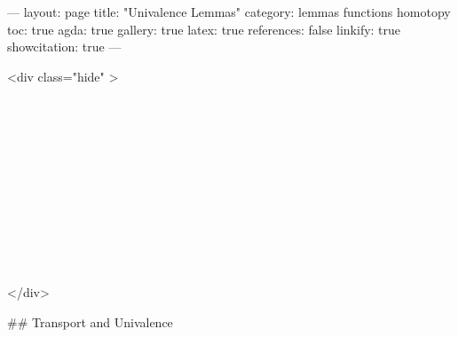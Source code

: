 ---
layout: page
title: "Univalence Lemmas"
category: lemmas functions homotopy
toc: true
agda: true
gallery: true
latex: true
references: false
linkify: true
showcitation: true
---

<div class="hide" >
\begin{code}%
\>[0]\AgdaSymbol{\{-\#}\AgdaSpace{}%
\AgdaSpace{}%
\AgdaSpace{}%
\AgdaSymbol{\#-\}}\<%
\\
\>[0]\AgdaSpace{}%
\AgdaSpace{}%
\<%
\\
\>[0]\AgdaSpace{}%
\AgdaSpace{}%
\<%
\\
%
\\[\AgdaEmptyExtraSkip]%
\>[0]\AgdaSpace{}%
\AgdaSpace{}%
\<%
\\
\>[0]\AgdaSpace{}%
\AgdaSpace{}%
\<%
\\
\>[0]\AgdaSpace{}%
\AgdaSpace{}%
\<%
\\
\>[0]\AgdaSpace{}%
\AgdaSpace{}%
\<%
\\
%
\\[\AgdaEmptyExtraSkip]%
%
\\[\AgdaEmptyExtraSkip]%
\>[0]\AgdaSpace{}%
\AgdaSpace{}%
\<%
\end{code}
</div>

## Transport and Univalence

\begin{code}%
\>[0]\AgdaSpace{}%
\AgdaSpace{}%
\<%
\end{code}

